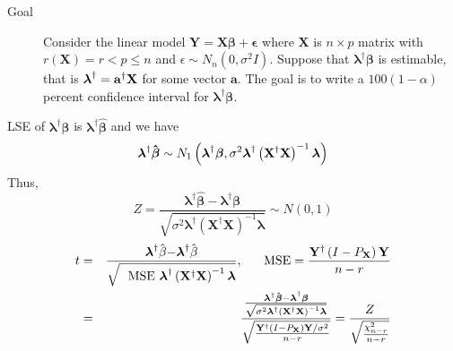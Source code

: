 \documentclass{article}
\begin{document}
\begin{description}
\item[Goal] Consider the linear model $\mathbf{Y=X\beta +\epsilon }$ where $%
\mathbf{X}$ is $n\times p$ matrix with $r\left( \mathbf{X}\right) =r<p\leq n$
and $\epsilon \sim N_{n}\left( 0,\sigma ^{2}I\right) $. Suppose that $%
\mathbf{\lambda }^{\dagger }\mathbf{\beta }$ is estimable, that is $\mathbf{%
\lambda }^{\dagger }=\mathbf{a}^{\dagger }\mathbf{X}$ for some vector $%
\mathbf{a}$. The goal is to write a $100\left( 1-\alpha \right) $ percent
confidence interval for $\mathbf{\lambda }^{\dagger }\mathbf{\beta }$.
\end{description}

\bigskip

LSE of $\mathbf{\lambda }^{\dagger }\mathbf{\beta }$ is $\mathbf{\lambda }%
^{\dagger }\mathbf{\hat{\beta}}$ and we have%
\begin{equation*}
\mathbf{\lambda }^{\dagger }\mathbf{\hat{\beta}}\sim N_{1}\left( \mathbf{%
\lambda }^{\dagger }\mathbf{\beta },\sigma ^{2}\mathbf{\lambda }^{\dagger
}\left( \mathbf{X}^{\dagger }\mathbf{X}\right) ^{-1}\mathbf{\lambda }\right)
\end{equation*}%
Thus,%
\begin{equation*}
Z=\frac{\mathbf{\lambda }^{\dagger }\mathbf{\hat{\beta}}-\mathbf{\lambda }%
^{\dagger }\mathbf{\beta }}{\sqrt{\sigma ^{2}\mathbf{\lambda }^{\dagger
}\left( \mathbf{X}^{\dagger }\mathbf{X}\right) ^{-1}\mathbf{\lambda }}}\sim
N\left( 0,1\right)
\end{equation*}%
\begin{eqnarray*}
t &=&\frac{\mathbf{\lambda }^{\dagger }\hat{\beta}\mathbf{-\lambda }%
^{\dagger }\hat{\beta}}{\sqrt{\text{MSE }\mathbf{\lambda }^{\dagger }\left( 
\mathbf{X}^{\dagger }\mathbf{X}\right) ^{-1}\mathbf{\lambda }}},\quad \text{%
MSE}=\frac{\mathbf{Y}^{\dagger }\left( I-P_{\mathbf{X}}\right) \mathbf{Y}}{%
n-r} \\
&=&\frac{\frac{\mathbf{\lambda }^{\dagger }\mathbf{\hat{\beta}-\lambda }%
^{\dagger }\mathbf{\beta }}{\sqrt{\sigma ^{2}\mathbf{\lambda }^{\dagger
}\left( \mathbf{X}^{\dagger }\mathbf{X}\right) ^{-1}\mathbf{\lambda }}}}{%
\sqrt{\frac{\mathbf{Y}^{\dagger }\left( I-P_{\mathbf{X}}\right) \mathbf{Y}%
/\sigma ^{2}}{n-r}}}=\frac{Z}{\sqrt{\frac{\chi _{n-r}^{2}}{n-r}}}
\end{eqnarray*}

\bigskip
\end{document}
